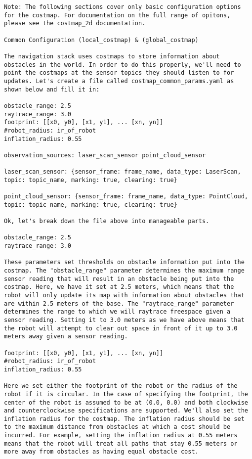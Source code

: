 \begin{verbatim}
Note: The following sections cover only basic configuration options for the costmap. For documentation on the full range of opitons, please see the costmap_2d documentation.

Common Configuration (local_costmap) & (global_costmap)

The navigation stack uses costmaps to store information about obstacles in the world. In order to do this properly, we'll need to point the costmaps at the sensor topics they should listen to for updates. Let's create a file called costmap_common_params.yaml as shown below and fill it in:

obstacle_range: 2.5
raytrace_range: 3.0
footprint: [[x0, y0], [x1, y1], ... [xn, yn]]
#robot_radius: ir_of_robot
inflation_radius: 0.55

observation_sources: laser_scan_sensor point_cloud_sensor

laser_scan_sensor: {sensor_frame: frame_name, data_type: LaserScan, topic: topic_name, marking: true, clearing: true}

point_cloud_sensor: {sensor_frame: frame_name, data_type: PointCloud, topic: topic_name, marking: true, clearing: true}

Ok, let's break down the file above into manageable parts.

obstacle_range: 2.5
raytrace_range: 3.0

These parameters set thresholds on obstacle information put into the costmap. The "obstacle_range" parameter determines the maximum range sensor reading that will result in an obstacle being put into the costmap. Here, we have it set at 2.5 meters, which means that the robot will only update its map with information about obstacles that are within 2.5 meters of the base. The "raytrace_range" parameter determines the range to which we will raytrace freespace given a sensor reading. Setting it to 3.0 meters as we have above means that the robot will attempt to clear out space in front of it up to 3.0 meters away given a sensor reading.

footprint: [[x0, y0], [x1, y1], ... [xn, yn]]
#robot_radius: ir_of_robot
inflation_radius: 0.55

Here we set either the footprint of the robot or the radius of the robot if it is circular. In the case of specifying the footprint, the center of the robot is assumed to be at (0.0, 0.0) and both clockwise and counterclockwise specifications are supported. We'll also set the inflation radius for the costmap. The inflation radius should be set to the maximum distance from obstacles at which a cost should be incurred. For example, setting the inflation radius at 0.55 meters means that the robot will treat all paths that stay 0.55 meters or more away from obstacles as having equal obstacle cost.


\end{verbatim}

